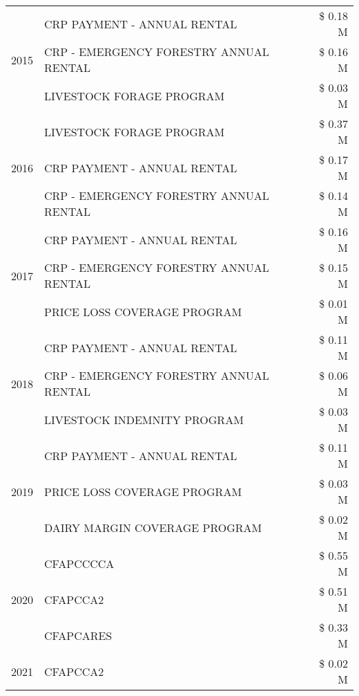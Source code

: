 \begin{tabular}{llr}
\cline{1-3}
\multirow[t]{3}{*}{2015} & CRP PAYMENT - ANNUAL RENTAL & \$ 0.18 M \\
 & CRP - EMERGENCY FORESTRY ANNUAL RENTAL & \$ 0.16 M \\
 & LIVESTOCK FORAGE PROGRAM & \$ 0.03 M \\
\cline{1-3}
\multirow[t]{3}{*}{2016} & LIVESTOCK FORAGE PROGRAM & \$ 0.37 M \\
 & CRP PAYMENT - ANNUAL RENTAL & \$ 0.17 M \\
 & CRP - EMERGENCY FORESTRY ANNUAL RENTAL & \$ 0.14 M \\
\cline{1-3}
\multirow[t]{3}{*}{2017} & CRP PAYMENT - ANNUAL RENTAL & \$ 0.16 M \\
 & CRP - EMERGENCY FORESTRY ANNUAL RENTAL & \$ 0.15 M \\
 & PRICE LOSS COVERAGE PROGRAM & \$ 0.01 M \\
\cline{1-3}
\multirow[t]{3}{*}{2018} & CRP PAYMENT - ANNUAL RENTAL & \$ 0.11 M \\
 & CRP - EMERGENCY FORESTRY ANNUAL RENTAL & \$ 0.06 M \\
 & LIVESTOCK INDEMNITY PROGRAM & \$ 0.03 M \\
\cline{1-3}
\multirow[t]{3}{*}{2019} & CRP PAYMENT - ANNUAL RENTAL & \$ 0.11 M \\
 & PRICE LOSS COVERAGE PROGRAM & \$ 0.03 M \\
 & DAIRY MARGIN COVERAGE PROGRAM & \$ 0.02 M \\
\cline{1-3}
\multirow[t]{3}{*}{2020} & CFAPCCCCA & \$ 0.55 M \\
 & CFAPCCA2 & \$ 0.51 M \\
 & CFAPCARES & \$ 0.33 M \\
\cline{1-3}
2021 & CFAPCCA2 & \$ 0.02 M \\
\cline{1-3}
\bottomrule
\end{tabular}
